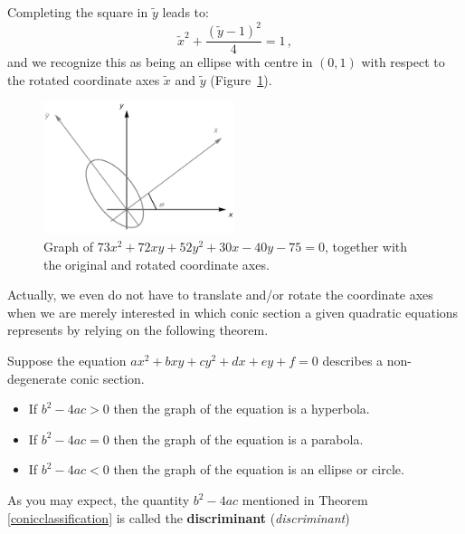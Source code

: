 \begin{example}
Completing the square in $\widetilde{y}$ leads to:
$$
\widetilde{x}^2+\dfrac{\left(\widetilde{y}-1\right)^2}{4}=1\,,
$$
and we recognize this as being an ellipse with centre in $(0,1)$ with respect to the rotated coordinate axes $\widetilde{x}$ and $\widetilde{y}$ (Figure~\ref{fig_trans_47}).

\begin{figure}[H]
	\begin{center}
			\includegraphics[width=0.5\textwidth]{fig_trans_47}
	\caption{Graph of $73x^2+72xy+52y^2+30x-40y-75=0$, together with the original and rotated coordinate axes. }
	\label{fig_trans_47}
	\end{center}
\end{figure}



\end{example}


Actually, we even do not have to translate and/or rotate the coordinate axes when we are merely interested in which conic section a given quadratic equations represents by relying on the following theorem.


\begin{theorem}\label{conicclassification} 

Suppose the equation $ax^2 + bxy + cy^2 + dx + ey + f = 0$ describes a non-degenerate conic section.

\begin{itemize}

\item If $b^2 - 4ac > 0$ then the graph of the equation is a hyperbola.

\item If $b^2 - 4ac =0$ then the graph of the equation is a parabola.

\item If $b^2 - 4ac < 0$ then the graph of the equation is an ellipse or circle.

\end{itemize}

\end{theorem}
As you may expect, the quantity $b^2 - 4ac$ mentioned in Theorem \ref{conicclassification} is called the \textbf{discriminant} (\textit{discriminant}) 



